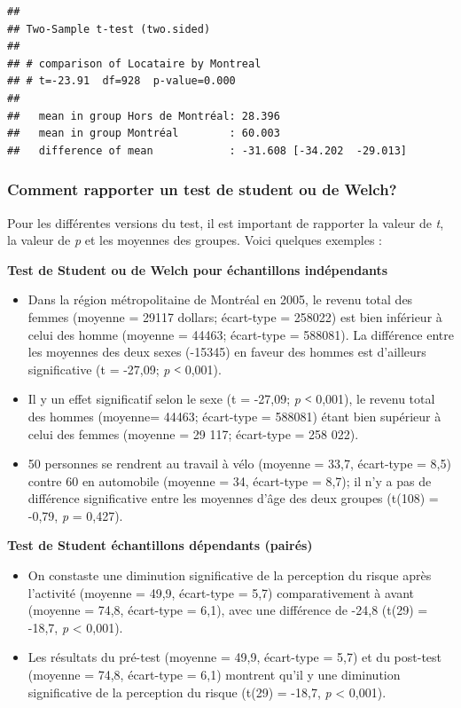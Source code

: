 \documentclass[
  11pt,
  french,
]{book}
\providecommand{\tightlist}{%
  \setlength{\itemsep}{0pt}\setlength{\parskip}{0pt}}
\begin{document}
\begin{verbatim}
## 
## Two-Sample t-test (two.sided)
## 
## # comparison of Locataire by Montreal
## # t=-23.91  df=928  p-value=0.000
## 
##   mean in group Hors de Montréal: 28.396
##   mean in group Montréal        : 60.003
##   difference of mean            : -31.608 [-34.202  -29.013]
\end{verbatim}

\hypertarget{sect04315}{%
\subsubsection{Comment rapporter un test de student ou de Welch?}\label{sect04315}}

Pour les différentes versions du test, il est important de rapporter la valeur de \emph{t}, la valeur de \emph{p} et les moyennes des groupes. Voici quelques exemples :

\textbf{Test de Student ou de Welch pour échantillons indépendants}

\begin{itemize}
\tightlist
\item
  Dans la région métropolitaine de Montréal en 2005, le revenu total des femmes (moyenne = 29117 dollars; écart-type = 258022) est bien inférieur à celui des homme (moyenne = 44463; écart-type = 588081). La différence entre les moyennes des deux sexes (-15345) en faveur des hommes est d'ailleurs significative (t = -27,09; \emph{p} ˂ 0,001).
\item
  Il y un effet significatif selon le sexe (t = -27,09; \emph{p} ˂ 0,001), le revenu total des hommes (moyenne= 44463; écart-type = 588081) étant bien supérieur à celui des femmes (moyenne = 29 117; écart-type = 258 022).
\item
  50 personnes se rendrent au travail à vélo (moyenne = 33,7, écart-type = 8,5) contre 60 en automobile (moyenne = 34, écart-type = 8,7); il n'y a pas de différence significative entre les moyennes d'âge des deux groupes (t(108) = -0,79, \emph{p} = 0,427).
\end{itemize}

\textbf{Test de Student échantillons dépendants (pairés)}

\begin{itemize}
\tightlist
\item
  On constaste une diminution significative de la perception du risque après l'activité (moyenne = 49,9, écart-type = 5,7) comparativement à avant (moyenne = 74,8, écart-type = 6,1), avec une différence de -24,8 (t(29) = -18,7, \emph{p} \textless{} 0,001).
\item
  Les résultats du pré-test (moyenne = 49,9, écart-type = 5,7) et du post-test (moyenne = 74,8, écart-type = 6,1) montrent qu'il y une diminution significative de la perception du risque (t(29) = -18,7, \emph{p} \textless{} 0,001).
\end{itemize}
\end{document}
